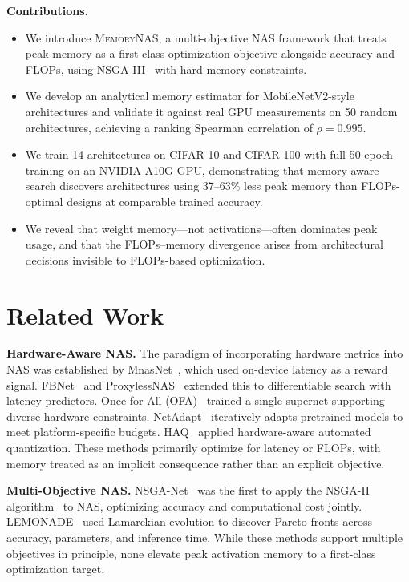 \documentclass[10pt,twocolumn,letterpaper]{article}
\newcommand{\ours}{\textsc{MemoryNAS}}
\begin{document}
\textbf{Contributions.}
\begin{itemize}[leftmargin=*,nosep]
    \item We introduce \ours{}, a multi-objective NAS framework that treats peak memory as a first-class optimization objective alongside accuracy and FLOPs, using NSGA-III~\cite{deb2014nsga3} with hard memory constraints.
    \item We develop an analytical memory estimator for MobileNetV2-style architectures and validate it against real GPU measurements on 50 random architectures, achieving a ranking Spearman correlation of $\rho = 0.995$.
    \item We train 14 architectures on CIFAR-10 and CIFAR-100 with full 50-epoch training on an NVIDIA A10G GPU, demonstrating that memory-aware search discovers architectures using 37--63\% less peak memory than FLOPs-optimal designs at comparable trained accuracy.
    \item We reveal that weight memory---not activations---often dominates peak usage, and that the FLOPs--memory divergence arises from architectural decisions invisible to FLOPs-based optimization.
\end{itemize}

\section{Related Work}
\label{sec:related}

\textbf{Hardware-Aware NAS.} The paradigm of incorporating hardware metrics into NAS was established by MnasNet~\cite{tan2019mnasnet}, which used on-device latency as a reward signal. FBNet~\cite{wu2019fbnet} and ProxylessNAS~\cite{cai2019proxylessnas} extended this to differentiable search with latency predictors. Once-for-All (OFA)~\cite{cai2020once} trained a single supernet supporting diverse hardware constraints. NetAdapt~\cite{yang2018netadapt} iteratively adapts pretrained models to meet platform-specific budgets. HAQ~\cite{wang2019haq} applied hardware-aware automated quantization. These methods primarily optimize for latency or FLOPs, with memory treated as an implicit consequence rather than an explicit objective.

\textbf{Multi-Objective NAS.} NSGA-Net~\cite{lu2019nsganet} was the first to apply the NSGA-II algorithm~\cite{deb2002nsga2} to NAS, optimizing accuracy and computational cost jointly. LEMONADE~\cite{elsken2019lemonade} used Lamarckian evolution to discover Pareto fronts across accuracy, parameters, and inference time. While these methods support multiple objectives in principle, none elevate peak activation memory to a first-class optimization target.
\end{document}
